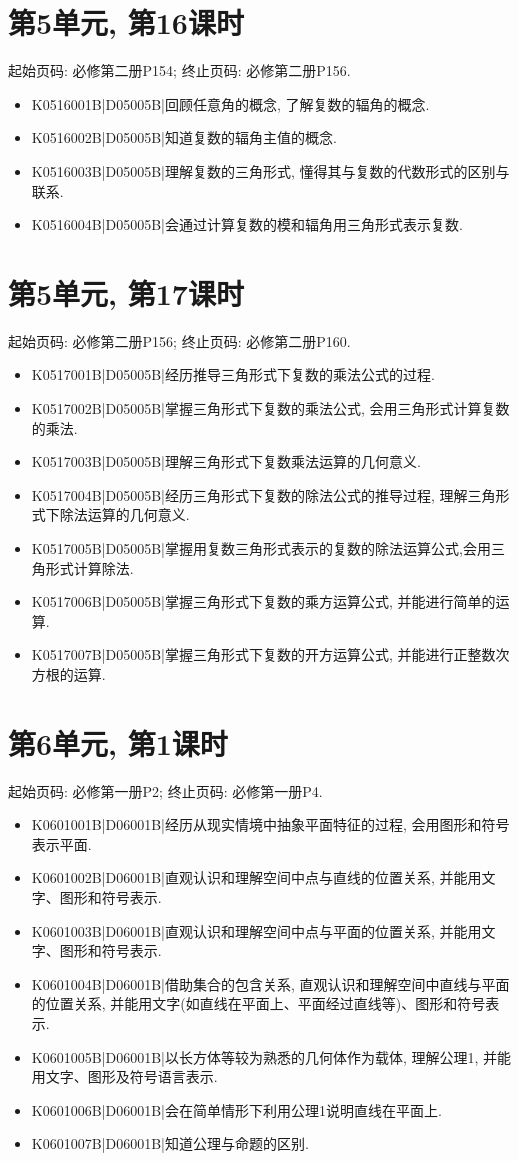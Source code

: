 \section*{第5单元, 第16课时}
起始页码: 必修第二册P154; 终止页码: 必修第二册P156.
\begin{itemize}
\item K0516001B|D05005B|回顾任意角的概念, 了解复数的辐角的概念.
\item K0516002B|D05005B|知道复数的辐角主值的概念.
\item K0516003B|D05005B|理解复数的三角形式, 懂得其与复数的代数形式的区别与联系.
\item K0516004B|D05005B|会通过计算复数的模和辐角用三角形式表示复数.
\end{itemize}

\section*{第5单元, 第17课时}
起始页码: 必修第二册P156; 终止页码: 必修第二册P160.
\begin{itemize}
\item K0517001B|D05005B|经历推导三角形式下复数的乘法公式的过程.
\item K0517002B|D05005B|掌握三角形式下复数的乘法公式, 会用三角形式计算复数的乘法.
\item K0517003B|D05005B|理解三角形式下复数乘法运算的几何意义.
\item K0517004B|D05005B|经历三角形式下复数的除法公式的推导过程, 理解三角形式下除法运算的几何意义.
\item K0517005B|D05005B|掌握用复数三角形式表示的复数的除法运算公式,会用三角形式计算除法.
\item K0517006B|D05005B|掌握三角形式下复数的乘方运算公式, 并能进行简单的运算.
\item K0517007B|D05005B|掌握三角形式下复数的开方运算公式, 并能进行正整数次方根的运算.
\end{itemize}

\section*{第6单元, 第1课时}
起始页码: 必修第一册P2; 终止页码: 必修第一册P4.
\begin{itemize}
\item K0601001B|D06001B|经历从现实情境中抽象平面特征的过程, 会用图形和符号表示平面.
\item K0601002B|D06001B|直观认识和理解空间中点与直线的位置关系, 并能用文字、图形和符号表示.
\item K0601003B|D06001B|直观认识和理解空间中点与平面的位置关系, 并能用文字、图形和符号表示.
\item K0601004B|D06001B|借助集合的包含关系, 直观认识和理解空间中直线与平面的位置关系, 并能用文字(如直线在平面上、平面经过直线等)、图形和符号表示.
\item K0601005B|D06001B|以长方体等较为熟悉的几何体作为载体, 理解公理1, 并能用文字、图形及符号语言表示.
\item K0601006B|D06001B|会在简单情形下利用公理1说明直线在平面上.
\item K0601007B|D06001B|知道公理与命题的区别.
\end{itemize}

